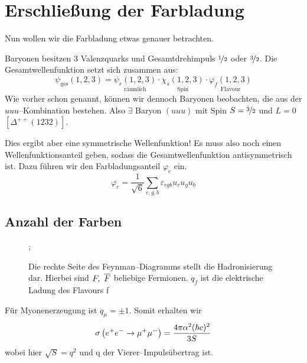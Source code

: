 \documentclass[Ex4_Zusammenfassung.tex]{subfiles}
\begin{document}
\section{Erschließung der Farbladung}
Nun wollen wir die Farbladung etwas genauer betrachten.

Baryonen besitzen 3 Valenzquarks und Gesamtdrehimpuls $\nicefrac{1}{2}$ oder $\nicefrac{3}{2}$. Die Gesamtwellenfunktion setzt sich zusammen aus:
\begin{equation}
	\psi_\text{ges}(1,2,3) =\underset{\text{räumlich}}{\psi_r(1,2,3)} \cdot \underset{\text{Spin}}{\chi_s (1,2,3)} \cdot \underset{\text{Flavour}}{\varphi_f (1,2,3)}
\end{equation}
Wie vorher schon genannt, können wir dennoch Baryonen beobachten, die aus der $uuu$--Kombination bestehen. Also $\exists$ Baryon $(uuu)$ mit Spin $S=\nicefrac{3}{2}$ und $L=0$ $\left[ \Delta^{++} (1232) \right]$.

Dies ergibt aber eine symmetrische Wellenfunktion! Es muss also noch einen Wellenfunktionsanteil geben, sodass die Gesamtwellenfunktion antisymmetrisch ist. Dazu führen wir den Farbladungsanteil $\varphi_c$ ein. 
\begin{equation}
	\varphi_c = \frac{1}{\sqrt{6}} \sum_{r,g,b} \varepsilon_{rgb} u_r u_g u_b
\end{equation}
\subsection{Anzahl der Farben}
\begin{figure}[H]
	\centering
	;
	\caption{Die rechte Seite des Feynman--Diagramms stellt die Hadronisierung dar. Hierbei sind $F,\ \ol{F}$ beliebige Fermionen. $q_f$ ist die elektrische Ladung des Flavours f}
\end{figure}
Für Myonenerzeugung ist $q_\mu = \pm 1$. Somit erhalten wir
\begin{equation}
	\sigma\left( e^+ e^- \rightarrow \mu^+ \mu^- \right) = \frac{4\pi \alpha^2 (\hslash c)^2}{3S}
\end{equation}
wobei hier $\sqrt{S}=q^2$ und q der Vierer--Impulsübertrag ist.
\end{document}
